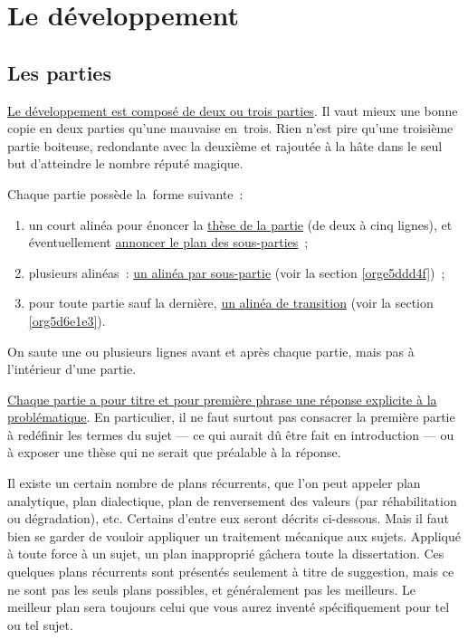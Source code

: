 \documentclass[a4paper,12pt]{report}
\begin{document}
\chapter{Le développement}
\label{sec:orgab5cd41}
\label{orgfd2d501}

\section{Les parties}
\label{sec:org38bd783}
\label{org05b9257}

\uline{Le développement est composé de deux ou trois parties}. Il vaut mieux
une bonne copie en deux parties qu'une mauvaise en trois. Rien n'est
pire qu'une troisième partie boiteuse, redondante avec la deuxième et
rajoutée à la hâte dans le seul but d'atteindre le nombre réputé
magique.

Chaque partie possède la forme suivante :

\begin{enumerate}
\item un court alinéa pour énoncer la \uline{thèse de la partie} (de deux à cinq
lignes), et éventuellement \uline{annoncer le plan des sous-parties} ;
\item plusieurs alinéas : \uline{un alinéa par sous-partie} (voir la section
\ref{orge5ddd4f}) ;
\item pour toute partie sauf la dernière, \uline{un alinéa de transition} (voir
la section \ref{org5d6e1e3}).
\end{enumerate}

On saute une ou plusieurs lignes avant et après chaque partie, mais pas
à l'intérieur d'une partie.

\uline{Chaque partie a pour titre et pour première phrase une réponse
explicite à la problématique}. En particulier, il ne faut surtout pas
consacrer la première partie à redéfinir les termes du sujet --- ce qui
aurait dû être fait en introduction --- ou à exposer une thèse qui ne
serait que préalable à la réponse.

Il existe un certain nombre de plans récurrents, que l'on peut appeler
plan analytique, plan dialectique, plan de renversement des valeurs (par
réhabilitation ou dégradation), etc. Certains d'entre eux seront décrits
ci-dessous. Mais il faut bien se garder de vouloir appliquer un
traitement mécanique aux sujets. Appliqué à toute force à un sujet, un
plan inapproprié gâchera toute la dissertation. Ces quelques plans
récurrents sont présentés seulement à titre de suggestion, mais ce ne
sont pas les seuls plans possibles, et généralement pas les meilleurs.
Le meilleur plan sera toujours celui que vous aurez inventé
spécifiquement pour tel ou tel sujet.
\end{document}
